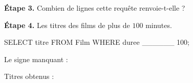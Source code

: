 \bigskip

\textbf{Étape 3.} Combien de lignes cette requête renvoie-t-elle ?

\medskip
\begin{center}
 \qquad {} \qquad {}
\end{center}

\bigskip

\textbf{Étape 4.} Les titres des films de plus de $100$ minutes.

\begin{sql}
SELECT titre FROM Film WHERE duree ______ 100;
\end{sql}

\medskip
Le signe manquant : \fbox{\texttt{>}} \qquad \fbox{\texttt{<}} \qquad \fbox{\texttt{=}}

\medskip
Titres obtenus : \dotfill
